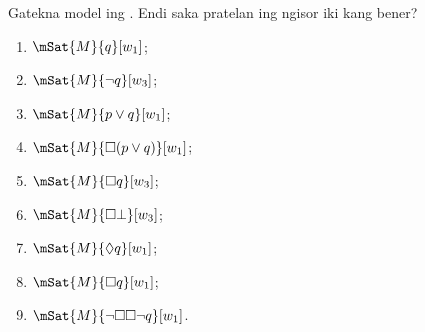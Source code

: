 \documentclass[../../../include/open-logic-section]{subfiles}
\begin{document}
\begin{prob}
  Gatekna model ing . Endi saka pratelan ing
  ngisor iki kang bener?
    \begin{enumerate}
    \item $\mSat{M}{q}[w_1]$;
    \item $\mSat{M}{\lnot q}[w_3]$;
    \item $\mSat{M}{p \lor q}[w_1]$;
    \item $\mSat{M}{\Box (p \lor q)}[w_1]$;
    \item $\mSat{M}{\Box q}[w_3]$;
    \item $\mSat{M}{\Box \bot}[w_3]$;
    \item $\mSat{M}{\Diamond q}[w_1]$;
    \item $\mSat{M}{\Box q}[w_1]$;
    \item $\mSat{M}{\lnot \Box\Box \lnot q}[w_1]$.
    \end{enumerate}
\end{prob}
\end{document}

